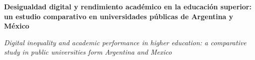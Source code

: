 
\renewcommand{\articuloidiomaxml}{es}
\renewcommand{\articulotitulo}{Desigualdad digital y rendimiento académico en la educación superior: un estudio comparativo en universidades públicas de Argentina y México}
\renewcommand{\articuloautores}{Persona Una}
\renewcommand{\articulodoi}{10.24215/18522971e134}
\renewcommand{\articulotipo}{ARTÍCULO DE INVESTIGACIÓN}
\renewcommand{\articulorevista}{Revista Revistas}
\renewcommand{\articuloissne}{1515-1573}
\renewcommand{\articulovolumen}{1}
\renewcommand{\articulonumero}{1}
\renewcommand{\articulofecha}{ 2026}
\renewcommand{\articulopagina}{0}

\setcounter{page}{0}
\thispagestyle{firstpage}

\noindent\begin{minipage}[t]{\dimexpr\textwidth+\marginparsep+\marginparwidth\relax}%
{\sffamily\bfseries\Large\articulotitulo\par}%
\end{minipage}\par
\vspace{3mm}%
\renewcommand{\articulotitulotrans}{Digital inequality and academic performance in higher education: a comparative study in public universities form Argentina and Mexico}
\noindent\begin{minipage}[t]{\dimexpr\textwidth+\marginparsep+\marginparwidth\relax}%
{\sffamily\itshape\normalsize\articulotitulotrans\par}%
\end{minipage}\par
\vspace{4mm}%

